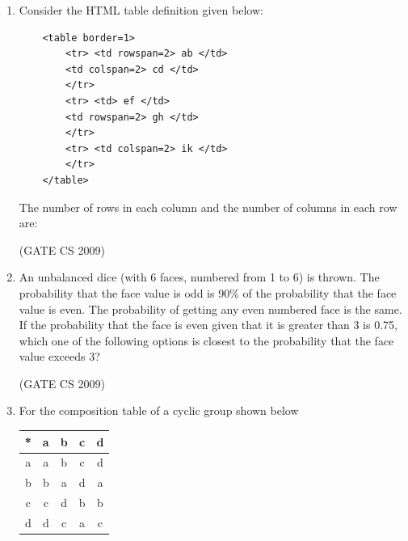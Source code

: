 \documentclass[a4paper, 11pt]{article}
\begin{document}
\begin{enumerate}
    \item Consider the HTML table definition given below:
    \begin{lstlisting}
    <table border=1>
        <tr> <td rowspan=2> ab </td>
        <td colspan=2> cd </td>
        </tr>
        <tr> <td> ef </td>
        <td rowspan=2> gh </td>
        </tr>
        <tr> <td colspan=2> ik </td>
        </tr>
    </table>
    \end{lstlisting}
    The number of rows in each column and the number of columns in each row are: 
    \begin{enumerate}
    \end{enumerate}

    \hfill (GATE CS 2009)

    \item An unbalanced dice (with 6 faces, numbered from 1 to 6) is thrown. The probability that the face value is odd is 90\% of the probability that the face value is even. The probability of getting any even numbered face is the same.\\
    If the probability that the face is even given that it is greater than 3 is 0.75, which one of the following options is closest to the probability that the face value exceeds 3?
    \begin{enumerate}
    \end{enumerate}


    \hfill (GATE CS 2009)

    \item  For the composition table of a cyclic group shown below\\
    \begin{tabular}{c|cccc}
        * &a &b &c &d \\
        \hline
        a &a &b &c &d \\
        b &b &a &d &a \\
        c &c &d &b &b \\
        d &d &c &a &c \\
        

\end{tabular}
\end{enumerate}
\end{document}
